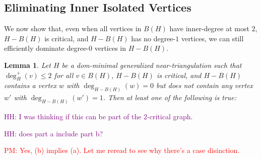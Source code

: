 \documentclass{article}
\newcommand{\pat}[1]{\textcolor{red}{PM: #1}}
\newcommand{\hussein}[1]{\textcolor{purple}{HH: #1}}
\newtheorem{lem}{Lemma}
\theoremstyle{definition}
\begin{document}
\subsection{Eliminating Inner Isolated Vertices}
\label{zero_kill_sec}

We now show that, even when all vertices in $B(H)$ have inner-degree at most $2$, $H-B(H)$ is critical, and $H-B(H)$ has no degree-$1$ vertices, we can still efficiently dominate degree-$0$ vertices in $H-B(H)$.

\begin{lem}\label{degree_zero_killer}
  Let $H$ be a dom-minimal generalized near-triangulation such that $\deg^+_H(v)\le 2$ for all $v\in B(H)$, $H-B(H)$ is critical, and $H-B(H)$ contains a vertex $w$ with $\deg_{H-B(H)}(w)=0$ but does not contain any vertex $w'$ with $\deg_{H-B(H)}(w')=1$.  Then at least one of the following is true:
\end{lem}

\hussein{I was thinking if this can be part of the 2-critical graph.}

\hussein{does part a include part b?}

\pat{Yes, (b) implies (a). Let me reread to see why there's a case disinction.}
\end{document}
